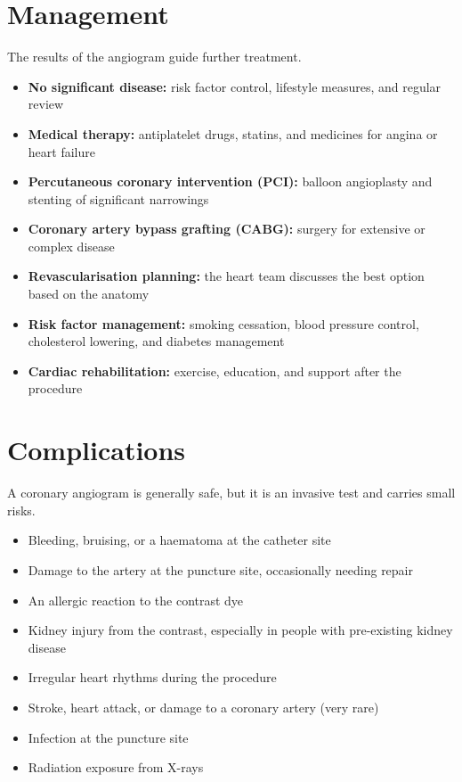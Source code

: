 \section*{Management}
The results of the angiogram guide further treatment.

\begin{itemize}
    \item \textbf{No significant disease:} risk factor control, lifestyle measures, and regular review
    \item \textbf{Medical therapy:} antiplatelet drugs, statins, and medicines for angina or heart failure
    \item \textbf{Percutaneous coronary intervention (PCI):} balloon angioplasty and stenting of significant narrowings
    \item \textbf{Coronary artery bypass grafting (CABG):} surgery for extensive or complex disease
    \item \textbf{Revascularisation planning:} the heart team discusses the best option based on the anatomy
    \item \textbf{Risk factor management:} smoking cessation, blood pressure control, cholesterol lowering, and diabetes management
    \item \textbf{Cardiac rehabilitation:} exercise, education, and support after the procedure
\end{itemize}

\section*{Complications}
A coronary angiogram is generally safe, but it is an invasive test and carries small risks.

\begin{itemize}
    \item Bleeding, bruising, or a haematoma at the catheter site
    \item Damage to the artery at the puncture site, occasionally needing repair
    \item An allergic reaction to the contrast dye
    \item Kidney injury from the contrast, especially in people with pre-existing kidney disease
    \item Irregular heart rhythms during the procedure
    \item Stroke, heart attack, or damage to a coronary artery (very rare)
    \item Infection at the puncture site
    \item Radiation exposure from X-rays
\end{itemize}

